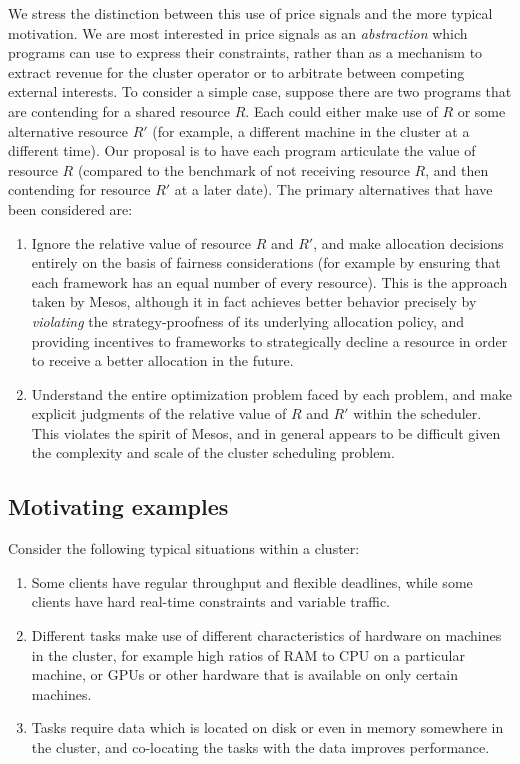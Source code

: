 \documentclass{acm_proc_article-sp}
\begin{document}
We stress the distinction between this use of price signals and the more typical
motivation. We are most interested in price signals as an \emph{abstraction} which
programs can use to express their constraints, rather than as a mechanism to
extract revenue for the cluster operator or to arbitrate between competing
external interests. To consider a simple case, suppose there are two programs
that are contending for a shared resource $R$. Each could either make use of $R$ or
some alternative resource $R'$ (for example, a different machine in the cluster at
a different time). Our proposal is to have each program articulate the value of
resource $R$ (compared to the benchmark of not receiving resource $R$, and then
contending for resource $R'$ at a later date). The primary alternatives that have
been considered are:
\vspace{-4mm}
\begin{enumerate}
\itemsep0em
  \item Ignore the relative value of resource $R$ and $R'$, and make allocation
    decisions entirely on the basis of fairness considerations (for example by
    ensuring that each framework has an equal number of every resource). This is
    the approach taken by Mesos, although it in fact achieves better behavior
    precisely by \emph{violating} the strategy-proofness of its underlying allocation
    policy, and providing incentives to frameworks to strategically decline a
    resource in order to receive a better allocation in the future.
  \item Understand the entire optimization problem faced by each problem, and
    make explicit judgments of the relative value of $R$ and $R'$ within the
    scheduler. This violates the spirit of Mesos, and in general appears to be
    difficult given the complexity and scale of the cluster scheduling problem.
\end{enumerate}

\subsection{Motivating examples}

Consider the following typical situations within a cluster:
\begin{enumerate}
  \item Some clients have regular throughput and flexible deadlines, while some
    clients have hard real-time constraints and variable traffic.
  \item Different tasks make use of different characteristics of hardware on
    machines in the cluster, for example high ratios of RAM to CPU on a
    particular machine, or GPUs or other hardware that is available on only
    certain machines.
  \item Tasks require data which is located on disk or even in memory somewhere
    in the cluster, and co-locating the tasks with the data improves
    performance.
\end{enumerate}
\end{document}
